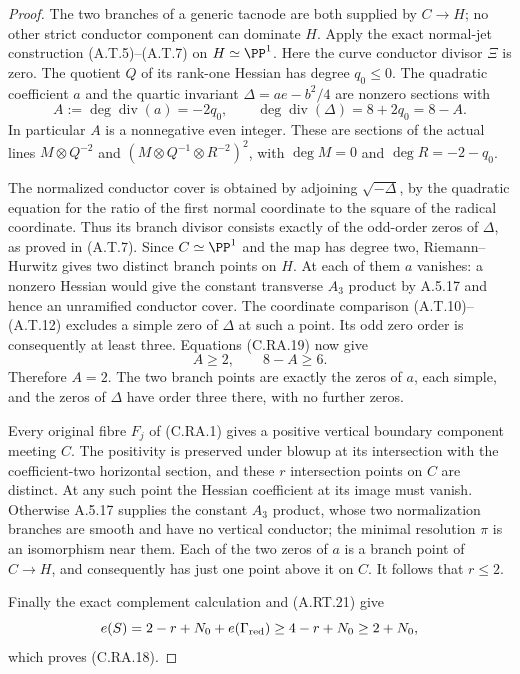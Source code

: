 \begin{proof}
The two branches of a generic tacnode are both supplied by
$C\to H$; no other strict conductor component can dominate $H$.
Apply the exact normal-jet construction (A.T.5)--(A.T.7) on
$H\simeq\PP^1$. Here the curve conductor divisor $\Xi$ is zero.
The quotient $Q$ of its rank-one Hessian has degree $q_0\le0$.
The quadratic coefficient $a$ and the quartic invariant
$\Delta=ae-b^2/4$ are nonzero sections with
\[
 A:=\deg\operatorname{div}(a)=-2q_0,\qquad
 \deg\operatorname{div}(\Delta)=8+2q_0=8-A.
\tag{C.RA.19}
\]
In particular $A$ is a nonnegative even integer. These are
sections of the actual lines $M\otimes Q^{-2}$ and
$(M\otimes Q^{-1}\otimes R^{-2})^2$, with
$\deg M=0$ and $\deg R=-2-q_0$.

The normalized conductor cover is obtained by adjoining
$\sqrt{-\Delta}$, by the quadratic equation for the ratio of
the first normal coordinate to the square of the radical
coordinate. Thus its branch divisor consists exactly of the
odd-order zeros of $\Delta$, as proved in (A.T.7). Since
$C\simeq\PP^1$ and the map has degree two, Riemann--Hurwitz
gives two distinct branch points on $H$. At each of them
$a$ vanishes: a nonzero Hessian would give the constant
transverse $A_3$ product by A.5.17 and hence an unramified
conductor cover. The coordinate comparison
(A.T.10)--(A.T.12) excludes a simple zero of $\Delta$ at
such a point. Its odd zero order is consequently at least
three. Equations (C.RA.19) now give
\[
                        A\ge2,\qquad 8-A\ge6.
\tag{C.RA.20}
\]
Therefore $A=2$. The two branch points are exactly the
zeros of $a$, each simple, and the zeros of $\Delta$ have
order three there, with no further zeros.

Every original fibre $F_j$ of (C.RA.1) gives a positive
vertical boundary component meeting $C$. The positivity
is preserved under blowup at its intersection with the
coefficient-two horizontal section, and these $r$
intersection points on $C$ are distinct. At any such point
the Hessian coefficient at its image must vanish. Otherwise
A.5.17 supplies the constant $A_3$ product, whose two
normalization branches are smooth and have no vertical
conductor; the minimal resolution $\pi$ is an isomorphism
near them. Each of the two zeros of $a$ is a branch point
of $C\to H$, and consequently has just one point above it
on $C$. It follows that $r\le2$.

Finally the exact complement calculation and (A.RT.21) give
\[
 e(S)=2-r+N_0+e(\Gamma_{\rm red})
                  \ge4-r+N_0\ge2+N_0,
\]
which proves (C.RA.18).
\end{proof}

